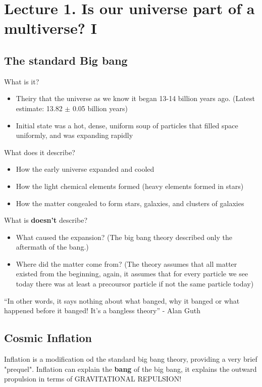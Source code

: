 \section{Lecture 1. Is our universe part of a multiverse? I}

\subsection*{The standard Big bang}
What is it?
\begin{itemize}
    \item Theiry that the universe as we know it began 13-14 billion years ago. (Latest estimate: 13.82 $\pm$ 0.05 billion years)
    \item Initial state was a hot, dense, uniform soup of particles that filled space uniformly, and was expanding rapidly
\end{itemize}

\noindent
What does it describe?
\begin{itemize}
    \item How the early universe expanded and cooled
    \item How the light chemical elements formed (heavy elements formed in stars)
    \item How the matter congealed to form stars, galaxies, and clusters of galaxies
\end{itemize}

\noindent
What is \textbf{doesn't} describe?
\begin{itemize}
    \item What caused the expansion? (The big bang theory described only the aftermath of the bang.)
    \item Where did the matter come from? (The theory assumes that all matter existed from the beginning, again, it assumes that for every particle we see today there was at least a precoursor particle if not the same particle today)
\end{itemize}

``In other words, it says nothing about what banged, why it banged or what happened before it banged! It's a bangless theory'' - Alan Guth

\subsection*{Cosmic Inflation}
Inflation is a modification od the standard big bang theory, providing a very brief "prequel". Inflation can explain the \textbf{bang} of the big bang, it explains the outward propulsion in terms of GRAVITATIONAL REPULSION!

